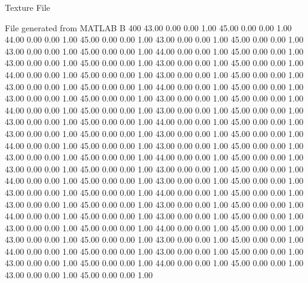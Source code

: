 Texture File

File generated from MATLAB
B 400
   43.00   0.00   0.00   1.00
   45.00   0.00   0.00   1.00
   44.00   0.00   0.00   1.00
   45.00   0.00   0.00   1.00
   43.00   0.00   0.00   1.00
   45.00   0.00   0.00   1.00
   43.00   0.00   0.00   1.00
   45.00   0.00   0.00   1.00
   44.00   0.00   0.00   1.00
   45.00   0.00   0.00   1.00
   43.00   0.00   0.00   1.00
   45.00   0.00   0.00   1.00
   43.00   0.00   0.00   1.00
   45.00   0.00   0.00   1.00
   44.00   0.00   0.00   1.00
   45.00   0.00   0.00   1.00
   43.00   0.00   0.00   1.00
   45.00   0.00   0.00   1.00
   43.00   0.00   0.00   1.00
   45.00   0.00   0.00   1.00
   44.00   0.00   0.00   1.00
   45.00   0.00   0.00   1.00
   43.00   0.00   0.00   1.00
   45.00   0.00   0.00   1.00
   43.00   0.00   0.00   1.00
   45.00   0.00   0.00   1.00
   44.00   0.00   0.00   1.00
   45.00   0.00   0.00   1.00
   43.00   0.00   0.00   1.00
   45.00   0.00   0.00   1.00
   43.00   0.00   0.00   1.00
   45.00   0.00   0.00   1.00
   44.00   0.00   0.00   1.00
   45.00   0.00   0.00   1.00
   43.00   0.00   0.00   1.00
   45.00   0.00   0.00   1.00
   43.00   0.00   0.00   1.00
   45.00   0.00   0.00   1.00
   44.00   0.00   0.00   1.00
   45.00   0.00   0.00   1.00
   43.00   0.00   0.00   1.00
   45.00   0.00   0.00   1.00
   43.00   0.00   0.00   1.00
   45.00   0.00   0.00   1.00
   44.00   0.00   0.00   1.00
   45.00   0.00   0.00   1.00
   43.00   0.00   0.00   1.00
   45.00   0.00   0.00   1.00
   43.00   0.00   0.00   1.00
   45.00   0.00   0.00   1.00
   44.00   0.00   0.00   1.00
   45.00   0.00   0.00   1.00
   43.00   0.00   0.00   1.00
   45.00   0.00   0.00   1.00
   43.00   0.00   0.00   1.00
   45.00   0.00   0.00   1.00
   44.00   0.00   0.00   1.00
   45.00   0.00   0.00   1.00
   43.00   0.00   0.00   1.00
   45.00   0.00   0.00   1.00
   43.00   0.00   0.00   1.00
   45.00   0.00   0.00   1.00
   44.00   0.00   0.00   1.00
   45.00   0.00   0.00   1.00
   43.00   0.00   0.00   1.00
   45.00   0.00   0.00   1.00
   43.00   0.00   0.00   1.00
   45.00   0.00   0.00   1.00
   44.00   0.00   0.00   1.00
   45.00   0.00   0.00   1.00
   43.00   0.00   0.00   1.00
   45.00   0.00   0.00   1.00
   43.00   0.00   0.00   1.00
   45.00   0.00   0.00   1.00
   44.00   0.00   0.00   1.00
   45.00   0.00   0.00   1.00
   43.00   0.00   0.00   1.00
   45.00   0.00   0.00   1.00
   43.00   0.00   0.00   1.00
   45.00   0.00   0.00   1.00
   44.00   0.00   0.00   1.00
   45.00   0.00   0.00   1.00
   43.00   0.00   0.00   1.00
   45.00   0.00   0.00   1.00
